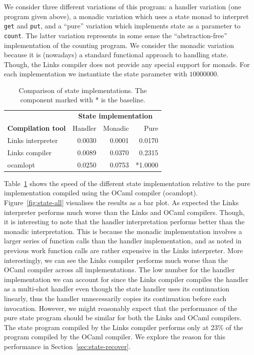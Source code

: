 \documentclass[12pt,mscres,cdtppar,twoside,openright,logo,rightchapter,normalheadings]{infthesis}
\theoremstyle{definition}
\begin{document}
We consider three different variations of this program: a handler
variation (one program given above), a monadic variation which uses a
state monad to interpret \lstinline$get$ and \lstinline$put$, and a
``pure'' variation which implements state as a parameter to
\lstinline$count$. The latter variation represents in some sense the
``abstraction-free'' implementation of the counting program. We
consider the monadic variation because it is (nowadays) a standard
functional approach to handling state. Though, the Links compiler does
not provide any special support for monads. For each implementation we
instantiate the state parameter with $10000000$.

\begin{table}
\centering
\begin{tabular}{| l || r | r | r |}
\cline{2-4}
\multicolumn{1}{c|}{~} & \multicolumn{3}{c|}{\textbf{State implementation}} \\
\cline{1-4}
\multicolumn{1}{|l||}{\textbf{Compilation tool}}  & Handler & Monadic & Pure \\
\hline
  Links interpreter & 0.0030   & 0.0001  & 0.0170 \\
\hline
  Links compiler    & 0.0089   & 0.0370 & 0.2315 \\
\hline
  ocamlopt          & 0.0250   & 0.0753  & *1.0000 \\
\hline
\end{tabular}
\caption{Comparison of state implementations. The component marked
  with * is the baseline.}\label{tbl:state-all}
\end{table}

Table~\ref{tbl:state-all} shows the speed of the different state
implementation relative to the pure implementation compiled using the
OCaml compiler (ocamlopt). Figure~\ref{fig:state-all} visualises the
results as a bar plot. As expected the Links interpreter performs much
worse than the Links and OCaml compilers. Though, it is interesting to
note that the handler interpretation performs better than the monadic
interpretation. This is because the monadic implementation involves a
larger series of function calls than the handler implementation, and
as noted in previous work \citep{Hillerstrom2015} function calls are
rather expensive in the Links interpreter. More interestingly, we can
see the Links compiler performs much worse than the OCaml compiler
across all implementations. The low number for the handler
implementation we can account for since the Links compiler compiles
the handler as a multi-shot handler even though the state handler uses
its continuation linearly, thus the handler unnecessarily copies its
continuation before each invocation. However, we might reasonably
expect that the performance of the pure state program should be
similar for both the Links and OCaml compilers. The state program
compiled by the Links compiler performs only at 23\% of the program
compiled by the OCaml compiler. We explore the reason for this
performance in Section~\ref{sec:state-recover}.
\end{document}
